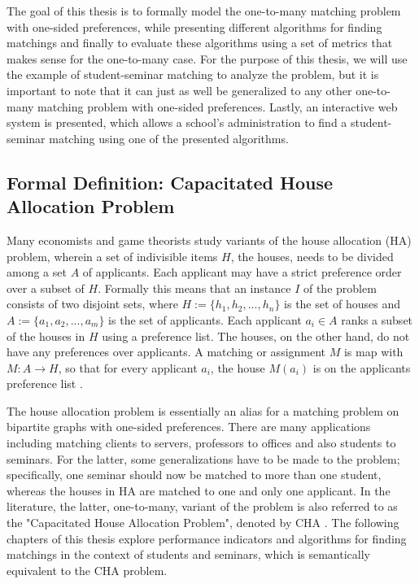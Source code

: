 The goal of this thesis is to formally model the one-to-many matching problem with one-sided preferences, while presenting different algorithms for finding matchings and finally to evaluate these algorithms using a set of metrics that makes sense for the one-to-many case. For the purpose of this thesis, we will use the example of student-seminar matching to analyze the problem, but it is important to note that it can just as well be generalized to any other one-to-many matching problem with one-sided preferences. Lastly, an interactive web system is presented, which allows a school's administration to find a student-seminar matching using one of the presented algorithms. 

\subsection{Formal Definition: Capacitated House Allocation Problem}\label{intro:cha}
Many economists and game theorists \cite{FEKETE2003219} study variants of the house allocation (HA) problem, wherein a set of indivisible items $H$, the houses, needs to be divided among a set $A$ of applicants. Each applicant may have a strict preference order over a subset of $H$. Formally this means that an instance $I$ of the problem consists of two disjoint sets, where $H := \{h_1, h_2, ..., h_n\}$ is the set of houses and $A := \{a_1, a_2, ..., a_m\}$ is the set of applicants. Each applicant $a_i \in A$ ranks a subset of the houses in $H$ using a preference list. The houses, on the other hand, do not have any preferences over applicants. A matching or assignment $M$ is map with $M: A \rightarrow H$, so that for every applicant $a_i$, the house $M(a_i)$ is on the applicants preference list \cite{SngThesis}. 

The house allocation problem is essentially an alias for a matching problem on bipartite graphs with one-sided preferences. There are many applications including matching clients to servers, professors to offices and also students to seminars. For the latter, some generalizations have to be made to the problem; specifically, one seminar should now be matched to more than one student, whereas the houses in HA are matched to one and only one applicant. In the literature, the latter, one-to-many, variant of the problem is also referred to as the "Capacitated House Allocation Problem", denoted by CHA \cite{algorithmics}. The following chapters of this thesis explore performance indicators and algorithms for finding matchings in the context of students and seminars, which is semantically equivalent to the CHA problem.

